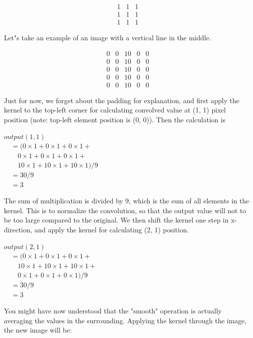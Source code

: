\[
 \begin{matrix}
  1 & 1 & 1 \\
  1 & 1 & 1 \\
  1 & 1 & 1
 \end{matrix}
\]

Let"s take an example of an image with a vertical line
in the middle.


\[
 \begin{matrix}
  0 & 0 & 10 & 0 & 0 \\
  0 & 0 & 10 & 0 & 0 \\
  0 & 0 & 10 & 0 & 0 \\
  0 & 0 & 10 & 0 & 0 \\
  0 & 0 & 10 & 0 & 0 
 \end{matrix}
\]


Just for now, we forget about the padding for explanation, and first
apply the kernel to the top-left corner for
calculating convolved value at (1, 1) pixel position (note: top-left element position is (0, 0)).
Then the calculation is


$output( 1 , 1 )$\\
$\quad = ( 0 \times 1 + 0 \times 1 + 0 \times 1 + $\\
$\qquad 0 \times 1 + 0 \times 1 + 0 \times 1 + $\\
$\qquad 10 \times 1 + 10 \times 1 + 10 \times 1 ) / 9 $\\
$\quad = 30 / 9 $\\
$\quad = 3$

The sum of multiplication is divided by 9, which is the sum of all
elements in the kernel. This is to normalize the convolution, so that
the output value will not to be too large compared to the original. We
then shift the kernel one step in x-direction, and apply the kernel for
calculating (2, 1) position. 

$output( 2 , 1)$\\
$\quad = ( 0 \times 1 + 0 \times 1 + 0 \times 1 + $\\
$\qquad 10 \times 1 + 10 \times 1+ 10 \times 1 +$\\ 
$\qquad 0 \times 1 + 0 \times 1 + 0 \times 1) / 9 $\\
$\quad = 30 / 9$\\ 
$\quad = 3$

You might have now understood that the
"smooth" operation is actually
averaging the values in the surrounding. Applying the kernel through
the image, the new image will be: 

